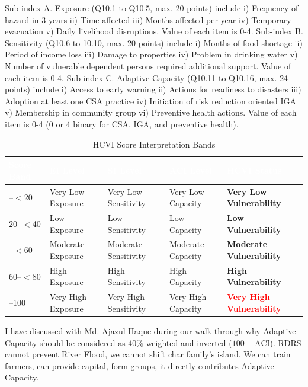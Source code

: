 \documentclass[12pt,a4paper]{report}
\newcommand{\headercell}[1]{\textcolor{white}{\textbf{#1}}}
\begin{document}
Sub-index A. Exposure (Q10.1 to Q10.5, max. 20 points) include i) Frequency of hazard in 3 years ii) Time affected iii) Months affected per year iv) Temporary evacuation v) Daily livelihood disruptions. Value of each item is 0-4. Sub-index B. Sensitivity (Q10.6 to 10.10, max. 20 points) include i) Months of food shortage ii) Period of income loss iii) Damage to properties iv) Problem in drinking water v) Number of vulnerable dependent persons required additional support. Value of each item is 0-4. Sub-index C. Adaptive Capacity (Q10.11 to Q10.16, max. 24 points) include i) Access to early warning ii) Actions for readiness to disasters iii) Adoption at least one CSA practice iv) Initiation of risk reduction oriented IGA v) Membership in community group vi) Preventive health actions. Value of each item is 0-4 (0 or 4 binary for CSA, IGA, and preventive health).

\begin{table}[htbp]
\centering\small\caption{HCVI Score Interpretation Bands}\label{tab:hcvi-bands}
\begin{tabular}{|>{\raggedright\arraybackslash}p{2.0cm}|>{\raggedright\arraybackslash}p{2.6cm}|>{\raggedright\arraybackslash}p{2.6cm}|>{\raggedright\arraybackslash}p{2.8cm}|>{\raggedright\arraybackslash}p{3.6cm}|}
\hline
\rowcolor{RDRSBlue}\headercell{Score Band} & \headercell{EI Level} & \headercell{SI Level} & \headercell{ACI Level} & \headercell{HCVI Status} \\ \hline
0--$<$20 & Very Low Exposure & Very Low Sensitivity & Very Low Capacity & \textcolor{RDRSTeal}{\textbf{Very Low Vulnerability}} \\ \hline
\rowcolor{RDRSLight} 20--$<$40 & Low Exposure & Low Sensitivity & Low Capacity & \textcolor{RDRSTeal}{\textbf{Low Vulnerability}} \\ \hline
40--$<$60 & Moderate Exposure & Moderate Sensitivity & Moderate Capacity & \textcolor{RDRSBlue}{\textbf{Moderate Vulnerability}} \\ \hline
\rowcolor{RDRSLight} 60--$<$80 & High Exposure & High Sensitivity & High Capacity & \textcolor{RDRSOrange}{\textbf{High Vulnerability}} \\ \hline
80--100 & Very High Exposure & Very High Sensitivity & Very High Capacity & \textcolor{red}{\textbf{Very High Vulnerability}} \\ \hline
\end{tabular}
\end{table}

I have discussed with Md. Ajazul Haque during our walk through why Adaptive Capacity should be considered as 40\% weighted and inverted ($100 - \mathrm{ACI}$). RDRS cannot prevent River Flood, we cannot shift char family's island. We can train farmers, can provide capital, form groups, it directly contributes Adaptive Capacity.
\end{document}
